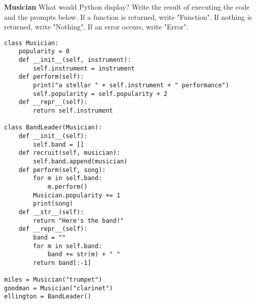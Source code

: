 \begin{blocksection}
\question \textbf{Musician} What would Python display? Write the result of executing the code and the prompts below. If a function is returned, write "Function". If nothing is returned, write "Nothing". If an error occurs, write "Error".

\begin{lstlisting}
class Musician:
    popularity = 0
    def __init__(self, instrument):
        self.instrument = instrument
    def perform(self):
        print("a stellar " + self.instrument + " performance")
        self.popularity = self.popularity + 2
    def __repr__(self):
        return self.instrument

class BandLeader(Musician):
    def __init__(self):
        self.band = []
    def recruit(self, musician):
        self.band.append(musician)
    def perform(self, song):
        for m in self.band:
            m.perform()
        Musician.popularity += 1
        print(song)
    def __str__(self):
        return "Here's the band!"
    def __repr__(self):
        band = ""
        for m in self.band:
            band += str(m) + " "
        return band[:-1]

miles = Musician("trumpet")
goodman = Musician("clarinet")
ellington = BandLeader()
\end{lstlisting}
\end{blocksection}

\newpage

